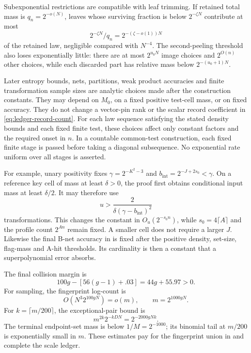 Subexponential restrictions are compatible with leaf trimming.
If retained total mass is \(q_n=2^{-o(N)}\), leaves whose surviving
fraction is below \(2^{-\zeta N}\) contribute at most
\[
                     2^{-\zeta N}/q_n
                       =2^{-(\zeta-o(1))N}
\]
of the retained law, negligible compared with \(N^{-4}\).
The second-peeling threshold also loses exponentially little:
there are at most \(2^{u_0N}\) image choices and \(2^{O(n)}\)
other choices, while each discarded part has relative mass below
\(2^{-(u_0+1)N}\).

Later entropy bounds, nets, partitions, weak product accuracies and
finite transformation sample sizes are analytic choices made after
the construction constants. They may depend on \(M_0\), on a fixed
positive test-cell mass, or on fixed accuracy.
They do not change a vector-pin rank or the scalar record coefficient
in \eqref{eq:ledger-record-count}.
For each law sequence satisfying the stated density bounds and each
fixed finite test, these choices affect only constant factors and the
required onset in \(n\). In a countable common-test construction,
each fixed finite stage is passed before taking a diagonal subsequence.
No exponential rate uniform over all stages is asserted.

For example, unary positivity fixes
\(\gamma=2^{-K^2-3}\) and
\(b_{\mathrm{int}}=2^{-J+2s_0}<\gamma\).
On a reference key cell of mass at least \(\delta>0\), the proof
first obtains conditional input mass at least \(\delta/2\).
It may therefore use
\[
                    u>\frac{2}{\delta(\gamma-b_{\mathrm{int}})^2}
\]
transformations. This changes the constant in
\(O_u(2^{-s_0n})\), while \(s_0=4\lceil A\rceil\) and the profile
count \(2^{An}\) remain fixed. A smaller cell does not require a
larger \(J\).
Likewise the final B-net accuracy in  is fixed
after the positive density, set-size, flag-mass and A-hit thresholds.
Its cardinality is then a constant that a superpolynomial error absorbs.

The final collision margin is
\[
                    100g-[56(g-1)+.03]=44g+55.97>0.
\]
For sampling, the fingerprint log-count is
\[
                O(N^3 2^{100gN})=o(m),\qquad m=2^{1000gN}.
\]
For \(k=\lceil m/200\rceil\), the exceptional-pair bound is
\[
                         m^{2k}2^{-kDN}=2^{-2000gNk}.
\]
The terminal endpoint-set mass is below \(1/M=2^{-1000}\);
its binomial tail at \(m/200\) is exponentially small in \(m\).
These estimates pay for the fingerprint union in
 and complete the scale ledger.
